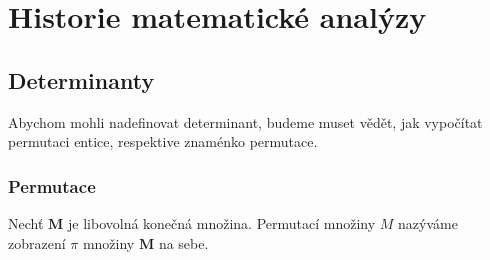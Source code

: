 \setchaptertoc
\chapter{Historie matematické analýzy}\label{mai:IchapXII}

  \section{Determinanty}
    Abychom mohli nadefinovat determinant, budeme muset vědět, jak vypočítat permutaci entice, 
    respektive znaménko permutace.
    \subsection{Permutace}
      \begin{definition}\label{permutace}
        Nechť \(\mathbf{M}\) je libovolná konečná množina. Permutací množiny \(M\) nazýváme 
        zobrazení \(\pi\) množiny \(\mathbf{M}\) na sebe.
      \end{definition}
      

